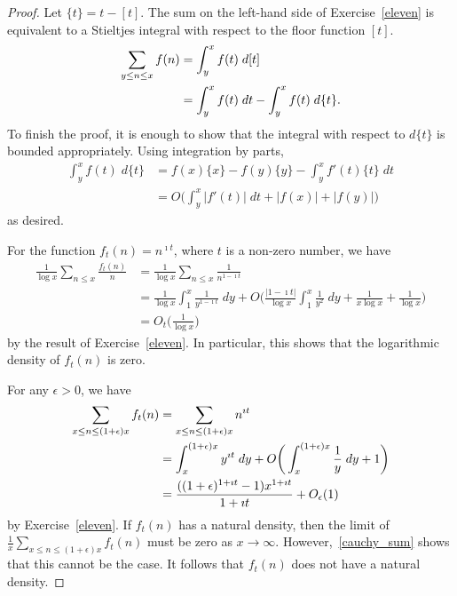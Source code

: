 \documentclass[11pt]{article}
\begin{document}
\begin{proof}
Let $\{t\}=t-[t]$. The sum on the left-hand side of Exercise~\ref{eleven} is equivalent to a Stieltjes integral with respect to the floor function $[t]$.
\begin{align}
\sum_{y\leq n\leq x}f(n) &= \int_y^xf(t)\;d[t]\notag\\
&= \int_y^xf(t)\;dt-\int_y^xf(t)\;d\{t\}\label{two_int}.
\end{align}
To finish the proof, it is enough to show that the integral with respect to $d\{t\}$ is bounded appropriately. Using integration by parts,
\begin{align*}
\int_y^xf(t)\;d\{t\} &= f(x)\{x\}-f(y)\{y\}-\int_y^xf'(t)\{t\}\;dt\\
&= O\bigg(\int_y^x|f'(t)|\;dt+|f(x)|+|f(y)|\bigg)
\end{align*}
as desired.

For the function $f_t(n)=n^{\imath t}$, where $t$ is a non-zero number, we have
\begin{align*}
\frac{1}{\log{x}}\sum_{n\leq x}\frac{f_t(n)}{n} &= \frac{1}{\log{x}}\sum_{n\leq x}\frac{1}{n^{1-\imath t}}\\
&= \frac{1}{\log{x}}\int_1^x\frac{1}{y^{1-\imath t}}\;dy+O\bigg(\frac{|1-\imath t|}{\log{x}}\int_1^x\frac{1}{y^2}\;dy+\frac{1}{x\log{x}}+\frac{1}{\log{x}}\bigg)\\
&= O_t\bigg(\frac{1}{\log{x}}\bigg)
\end{align*}
by the result of Exercise~\ref{eleven}. In particular, this shows that the logarithmic density of $f_t(n)$ is zero.

For any $\epsilon>0$, we have
\begin{align}
\sum_{x\leq n\leq (1+\epsilon)x}f_t(n) &= \sum_{x\leq n\leq (1+\epsilon)x}n^{\imath t}\notag\\
&= \int_x^{(1+\epsilon)x}y^{\imath t}\;dy+O\bigg(\int_x^{(1+\epsilon)x}\frac{1}{y}\;dy+1\bigg)\notag\\
&= \frac{((1+\epsilon)^{1+\imath t}-1)x^{1+\imath t}}{1+\imath t}+O_\epsilon(1)\label{cauchy_sum}
\end{align}
by Exercise~\ref{eleven}. If $f_t(n)$ has a natural density, then the limit of $\frac{1}{x}\sum_{x\leq n\leq (1+\epsilon)x}f_t(n)$ must be zero as $x\to\infty$. However,~\eqref{cauchy_sum} shows that this cannot be the case. It follows that $f_t(n)$ does not have a natural density.
\end{proof}
\end{document}
